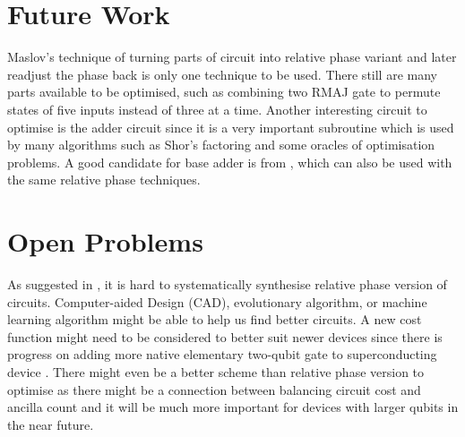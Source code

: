 \section{Future Work}
Maslov's technique of turning parts of circuit into relative phase variant and later readjust the phase back is only one technique to be used. There still are many parts available to be optimised, such as combining two RMAJ gate to permute states of five inputs instead of three at a time. Another interesting circuit to optimise is the adder circuit since it is a very important subroutine which is used by many algorithms such as Shor's factoring and some oracles of optimisation problems. A good candidate for base adder is from \citep{Wang2016}, which can also be used with the same relative phase techniques. 


\section{Open Problems}
As suggested in \citep{Maslov2016}, it is hard to systematically synthesise relative phase version of circuits. Computer-aided Design (CAD), evolutionary algorithm, or machine learning algorithm might be able to help us find better circuits. A new cost function might need to be considered to better suit newer devices since there is progress on adding more native elementary two-qubit gate to superconducting device \cite{Abrams2019}. There might even be a better scheme than relative phase version to optimise as there might be a connection between balancing circuit cost and ancilla count and it will be much more important for devices with larger qubits in the near future. 

